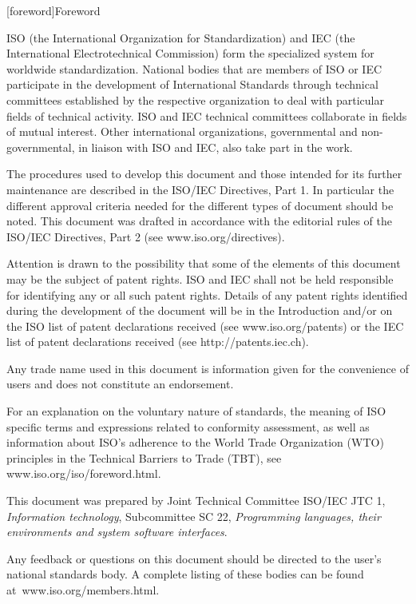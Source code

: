 
[foreword]{Foreword}

ISO (the International Organization for Standardization) and IEC (the International Electrotechnical Commission) form the specialized system for worldwide standardization. National bodies that are members of ISO or IEC participate in the development of International Standards through technical committees established by the respective organization to deal with particular fields of technical activity. ISO and IEC technical committees collaborate in fields of mutual interest. Other international organizations, governmental and non-governmental, in liaison with ISO and IEC, also take part in the work.

The procedures used to develop this document and those intended for its further maintenance are described in the ISO/IEC Directives, Part 1. In particular the different approval criteria needed for the different types of document should be noted. This document was drafted in accordance with the editorial rules of the ISO/IEC Directives, Part 2 (see www.iso.org/directives).

Attention is drawn to the possibility that some of the elements of this document may be the subject of patent rights. ISO and IEC shall not be held responsible for identifying any or all such patent rights. Details of any patent rights identified during the development of the document will be in the Introduction and/or on the ISO list of patent declarations received (see www.iso.org/patents) or the IEC list of patent declarations received (see http://patents.iec.ch).

Any trade name used in this document is information given for the convenience of users and does not constitute an endorsement.

For an explanation on the voluntary nature of standards, the meaning of ISO specific terms and expressions related to conformity assessment, as well as information about ISO’s adherence to the World Trade Organization (WTO) principles in the Technical Barriers to Trade (TBT), see www.iso.org/iso/foreword.html.

This document was prepared by Joint Technical Committee ISO/IEC JTC 1, \textit{Information technology}, Subcommittee SC 22, \textit{Programming languages, their environments and system software interfaces}.

Any feedback or questions on this document should be directed to the user’s national standards body. A complete listing of these bodies can be found at www.iso.org/members.html.
